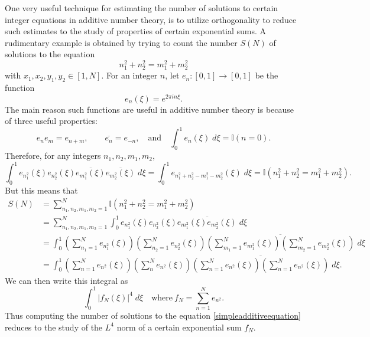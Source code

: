 	One very useful technique for estimating the number of solutions to certain integer equations in additive number theory, is to utilize orthogonality to reduce such estimates to the study of properties of certain exponential sums. A rudimentary example is obtained by trying to count the number $S(N)$ of solutions to the equation
	\begin{equation} \label{simpleadditiveequation}
		n_1^2 + n_2^2 = m_1^2 + m_2^2
	\end{equation}
	with $x_1,x_2,y_1,y_2 \in [1,N]$. For an integer $n$, let $e_n: [0,1] \to [0,1]$ be the function
	\[ e_n(\xi) = e^{2 \pi i n \xi}. \]
	The main reason such functions are useful in additive number theory is because of three useful properties:
	\[ e_n e_m = e_{n+m}, \quad\quad \overline{e_n} = e_{-n}, \quad\text{and}\quad \int_0^1 e_n(\xi)\; d\xi = \mathbb{I}(n = 0). \]
	Therefore, for any integers $n_1,n_2,m_1,m_2$,
	\[ \int_0^1 e_{n_1^2}(\xi) e_{n_2^2}(\xi) \overline{e_{m_1^2}(\xi)} \overline{e_{m_2^2}(\xi)}\; d\xi = \int_0^1 e_{n_1^2 + n_2^2 - m_1^2 - m_2^2}(\xi)\; d\xi = \mathbb{I}(n_1^2 + n_2^2 = m_1^2 + m_2^2).  \]
	But this means that
	\begin{align*}
		S(N) &= \sum_{n_1,n_2,m_1,m_2 = 1}^N \mathbb{I}(n_1^2 + n_2^2 = m_1^2 + m_2^2)\\
		&= \sum_{n_1,n_2,m_1,m_2 = 1}^N \int_0^1 e_{n_1^2}(\xi) e_{n_2^2}(\xi) \overline{e_{m_1^2}(\xi) e_{m_2^2}(\xi)}\; d\xi\\
		&= \int_0^1 \left( \sum_{n_1 = 1}^N e_{n_1^2}(\xi) \right) \left( \sum_{n_2 = 1}^N e_{n_2^2}(\xi) \right) \overline{\left( \sum_{m_1 = 1}^N e_{m_1^2}(\xi) \right) \left( \sum_{m_2 = 1}^N e_{m_2^2}(\xi) \right)}\; d\xi\\
		&= \int_0^1 \left( \sum_{n = 1}^N e_{n^2}(\xi) \right) \left( \sum_n^N e_{n^2}(\xi) \right) \overline{\left( \sum_{n = 1}^N e_{n^2}(\xi) \right) \left( \sum_{n = 1}^N e_{n^2}(\xi) \right)}\; d\xi.
	\end{align*}
	We can then write this integral as
	\[ \int_0^1 \left| f_N(\xi) \right|^4\; d\xi \quad\text{where}\ f_N = \sum_{n = 1}^N e_{n^2}. \]
	Thus computing the number of solutions to the equation \eqref{simpleadditiveequation} reduces to the study of the $L^4$ norm of a certain exponential sum $f_N$.

